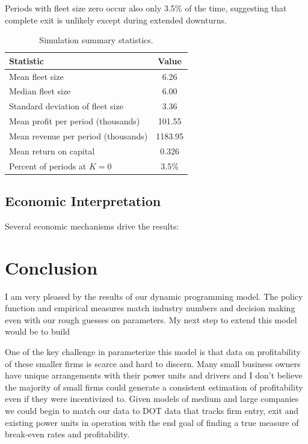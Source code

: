 \documentclass[12pt]{article}
\begin{document}
	Periods with fleet size zero occur also only 3.5\% of the time, suggesting that complete exit is unlikely except during extended downturns.
	
	\begin{table}[h!]
		\centering
		\begin{tabular}{l c}
			\hline
			Statistic & Value \\ \hline
			Mean fleet size & 6.26 \\
			Median fleet size & 6.00 \\
			Standard deviation of fleet size & 3.36 \\
			Mean profit per period (thousands) & 101.55 \\
			Mean revenue per period (thousands) & 1183.95 \\
			Mean return on capital & 0.326 \\
			Percent of periods at $K=0$ & 3.5\% \\
			\hline
		\end{tabular}
		\caption{Simulation summary statistics.}
		\label{tab:summary}
	\end{table}
	
	\subsection{Economic Interpretation}
	
	Several economic mechanisms drive the results:
	
	\section{Conclusion}
	
	I am very pleased by the results of our dynamic programming model.  The policy function and empirical measures match industry numbers and decision making even with our rough guesses on parameters.  My next step to extend this model would be to build  
	
	One of the key challenge in parameterize this model is that data on profitability of these smaller firms is scarce and hard to discern. Many small business owners have unique arrangements with their power units and drivers and I don't believe the majority of small firms could generate a consistent estimation of profitability even if they were incentivized to.  Given models of medium and large companies we could begin to match our data to DOT data that tracks firm entry, exit and existing power units in operation with the end goal of finding a true measure of break-even rates and profitability.
	
	
\end{document}
